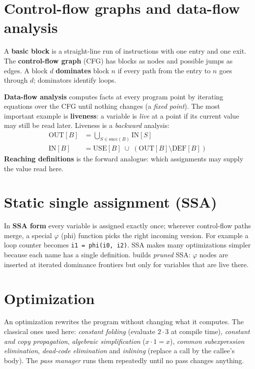 \section{Control-flow graphs and data-flow analysis}
A \textbf{basic block} is a straight-line run of instructions with one entry and one exit. The \textbf{control-flow graph} (CFG) has blocks as nodes and possible jumps as edges. A block $d$ \textbf{dominates} block $n$ if every path from the entry to $n$ goes through $d$; dominators identify loops.

\textbf{Data-flow analysis} computes facts at every program point by iterating equations over the CFG until nothing changes (a \emph{fixed point}). The most important example is \textbf{liveness}: a variable is \emph{live} at a point if its current value may still be read later. Liveness is a \emph{backward} analysis:
\begin{align*}
\mathrm{OUT}[B] &= \bigcup_{S \in \mathrm{succ}(B)} \mathrm{IN}[S]\\
\mathrm{IN}[B]  &= \mathrm{USE}[B] \;\cup\; (\mathrm{OUT}[B] \setminus \mathrm{DEF}[B])
\end{align*}
\textbf{Reaching definitions} is the forward analogue: which assignments may supply the value read here.

\section{Static single assignment (SSA)}
In \textbf{SSA form} every variable is assigned exactly once; wherever control-flow paths merge, a special $\varphi$ (phi) function picks the right incoming version. For example a loop counter becomes \verb|i1 = phi(i0, i2)|. SSA makes many optimizations simpler because each name has a single definition. \nova{} builds \emph{pruned} SSA: $\varphi$ nodes are inserted at iterated dominance frontiers but only for variables that are live there.

\section{Optimization}
An optimization rewrites the program without changing what it computes. The classical ones used here: \emph{constant folding} (evaluate $2\cdot 3$ at compile time), \emph{constant and copy propagation}, \emph{algebraic simplification} ($x\cdot 1 = x$), \emph{common subexpression elimination}, \emph{dead-code elimination} and \emph{inlining} (replace a call by the callee's body). The \emph{pass manager} runs them repeatedly until no pass changes anything.

